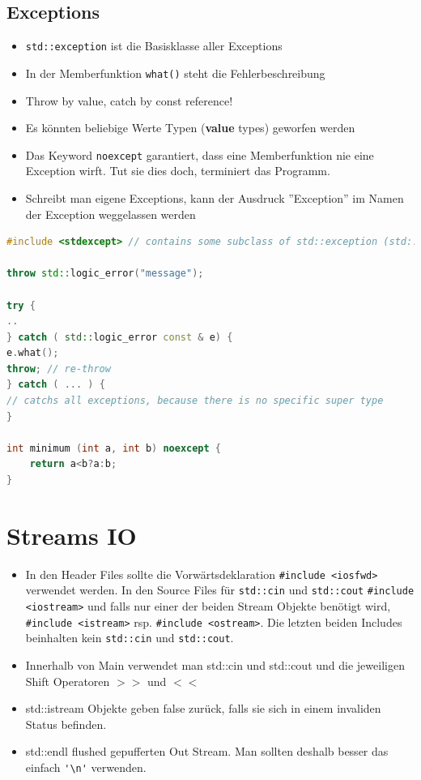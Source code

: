 \subsection{Exceptions}
\begin{itemize}
	\item \lstinline|std::exception| ist die Basisklasse aller Exceptions
	\item In der Memberfunktion \lstinline|what()| steht die Fehlerbeschreibung
	\item Throw by value, catch by const reference!
	\item Es könnten beliebige Werte Typen (\textbf{value} types) geworfen werden
	\item Das Keyword \lstinline|noexcept| garantiert, dass eine Memberfunktion nie eine Exception wirft. Tut sie dies doch, terminiert das Programm.
	\item Schreibt man eigene Exceptions, kann der Ausdruck ''Exception'' im Namen der Exception weggelassen werden
\end{itemize}
\begin{lstlisting}[language=C++]
#include <stdexcept> // contains some subclass of std::exception (std::logic_error or std::invalid_argument)

throw std::logic_error("message");

try {
.. 
} catch ( std::logic_error const & e) { 
e.what();
throw; // re-throw
} catch ( ... ) {
// catchs all exceptions, because there is no specific super type
}

int minimum (int a, int b) noexcept {
	return a<b?a:b;
}
\end{lstlisting}


\section{Streams IO}
\begin{itemize}
	\item In den Header Files sollte die Vorwärtsdeklaration \lstinline|#include <iosfwd>| verwendet werden. In den Source Files für \lstinline|std::cin| und \lstinline|std::cout| \lstinline|#include <iostream>| und falls nur einer der beiden Stream Objekte benötigt wird, \lstinline|#include <istream>| rsp. \lstinline|#include <ostream>|. Die letzten beiden Includes beinhalten kein \lstinline|std::cin| und \lstinline|std::cout|.
	\item Innerhalb von Main verwendet man std::cin und std::cout und die jeweiligen Shift Operatoren $>>$ und $<<$
	\item std::istream Objekte geben false zurück, falls sie sich in einem invaliden Status befinden.
	\item std::endl flushed gepufferten Out Stream. Man sollten deshalb besser das einfach \lstinline|'\n'| verwenden.
\end{itemize}

